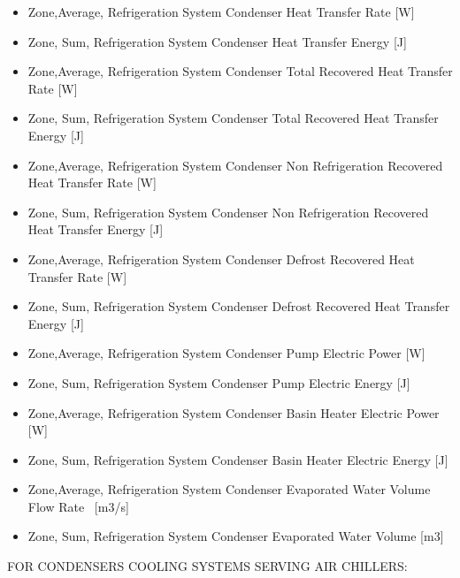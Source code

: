 \begin{itemize}
\item
  Zone,Average, Refrigeration System Condenser Heat Transfer Rate {[}W{]}
\item
  Zone, Sum, Refrigeration System Condenser Heat Transfer Energy {[}J{]}
\item
  Zone,Average, Refrigeration System Condenser Total Recovered Heat Transfer Rate {[}W{]}
\item
  Zone, Sum, Refrigeration System Condenser Total Recovered Heat Transfer Energy {[}J{]}
\item
  Zone,Average, Refrigeration System Condenser Non Refrigeration Recovered Heat Transfer Rate {[}W{]}
\item
  Zone, Sum, Refrigeration System Condenser Non Refrigeration Recovered Heat Transfer Energy {[}J{]}
\item
  Zone,Average, Refrigeration System Condenser Defrost Recovered Heat Transfer Rate {[}W{]}
\item
  Zone, Sum, Refrigeration System Condenser Defrost Recovered Heat Transfer Energy {[}J{]}
\item
  Zone,Average, Refrigeration System Condenser Pump Electric Power {[}W{]}
\item
  Zone, Sum, Refrigeration System Condenser Pump Electric Energy {[}J{]}
\item
  Zone,Average, Refrigeration System Condenser Basin Heater Electric Power {[}W{]}
\item
  Zone, Sum, Refrigeration System Condenser Basin Heater Electric Energy {[}J{]}
\item
  Zone,Average, Refrigeration System Condenser Evaporated Water Volume Flow Rate~ {[}m3/s{]}
\item
  Zone, Sum, Refrigeration System Condenser Evaporated Water Volume {[}m3{]}
\end{itemize}

FOR CONDENSERS COOLING SYSTEMS SERVING AIR CHILLERS:

